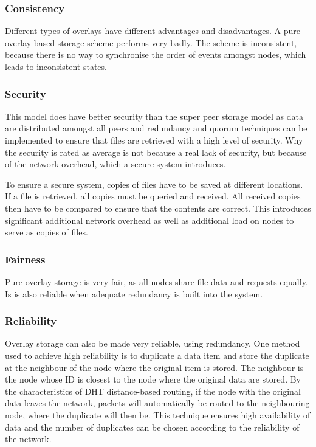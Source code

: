 \documentclass[10pt,a4paper,journal,cspaper,compsoc]{IEEEtran}
\begin{document}
\subsubsection{Consistency}
Different types of overlays have different advantages and disadvantages. A pure overlay-based storage scheme performs very badly. The scheme is
inconsistent, because there is no way to synchronise the order of events amongst nodes, which leads to inconsistent states.

\subsubsection{Security}
This model does have better security than the super peer storage model as data are distributed amongst all peers and redundancy and quorum techniques
can be implemented to ensure that files are retrieved with a high level of security. Why the security is rated as average is not because a real lack
of security, but because of the network overhead, which a secure system introduces.

To ensure a secure system, copies of files have to be saved at different locations. If a file is retrieved, all copies must be queried and received.
All received copies then have to be compared to ensure that the contents are correct. This introduces significant additional network overhead as well
as additional load on nodes to serve as copies of files.

\subsubsection{Fairness}
Pure overlay storage is very fair, as all nodes share file data and requests equally. Is is also reliable when adequate redundancy is built into the
system.

\subsubsection{Reliability}
Overlay storage can also be made very reliable, using redundancy. One method used to achieve high reliability is to duplicate a data item and store
the duplicate at the neighbour of the node where the original item is stored. The neighbour is the node whose ID is closest to the node where the
original data are stored. By the characteristics of DHT distance-based routing, if the node with the original data leaves the network, packets will
automatically be routed to the neighbouring node, where the duplicate will then be. This technique ensures high availability of data and the number
of duplicates can be chosen according to the reliability of the network.
\end{document}
